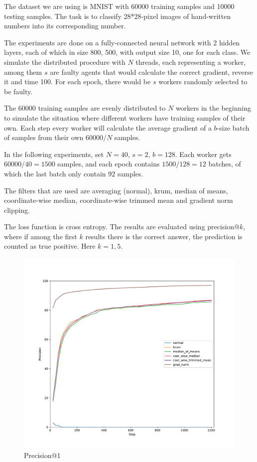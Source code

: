 \documentclass[10pt]{article}
\begin{document}
\large
The dataset we are using is MNIST with 60000 training samples and 10000 testing samples. The task is to classify 28*28-pixel images of hand-written numbers into its corresponding number.

The experiments are done on a fully-connected neural network with 2 hidden layers, each of which in size 800, 500, with output size 10, one for each class. We simulate the distributed procedure with $N$ threads, each representing a worker, among them $s$ are faulty agents that would calculate the correct gradient, reverse it and time 100. For each epoch, there would be $s$ workers randomly selected to be faulty. 

The 60000 training samples are evenly distributed to $N$ workers in the beginning to simulate the situation where different workers have training samples of their own. Each step every worker will calculate the average gradient of a $b$-size batch of samples from their own $60000/N$ samples. 

In the following experiments, set $N=40$, $s=2$, $b=128$. Each worker gets $60000/40=1500$ samples, and each epoch contains $1500/128=12$ batches, of which the last batch only contain $92$ samples.

The filters that are used are averaging (normal), krum, median of means, coordinate-wise median, coordinate-wise trimmed mean and gradient norm clipping.

The loss function is cross entropy. The results are evaluated using precision@$k$, where if among the first $k$ results there is the correct answer, the prediction is counted as true positive. Here $k=1,5$.

\begin{figure}[h]
	\centering
	\includegraphics[width=.8\textwidth]{prec1.pdf}
	\caption{Precision@1}
\end{figure}
\end{document}
